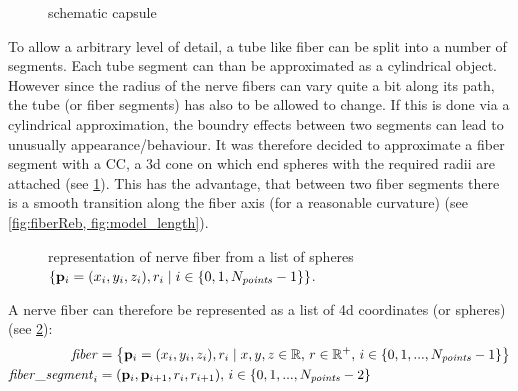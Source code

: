 % 
\begin{figure}[!t]
    \centering
    \setlength{\tikzwidth}{0.75\textwidth}
	\caption{schematic capsule}
	\label{fig:conical_capsule}
\end{figure}
% 
To allow a arbitrary level of detail, a tube like fiber can be split into a number of segments.
Each tube segment can than be approximated as a cylindrical object.
However since the radius of the nerve fibers can vary quite a bit along its path, the tube (or fiber segments) has also to be allowed to change.
If this is done via a cylindrical approximation, the boundry effects between two segments can lead to unusually appearance/behaviour.
It was therefore decided to approximate a fiber segment with a \ac{CC}, a 3d cone on which end spheres with the required radii are attached (see \cref{fig:conical_capsule}).
This has the advantage, that between two fiber segments there is a smooth transition along the fiber axis (for a reasonable curvature) (see \cref{fig:fiberReb, fig:model_length}).
% 
\begin{figure}[!t]
    \setlength{\tikzwidth}{0.85\textwidth}
    \centering
	\caption[]{representation of nerve fiber from a list of spheres $\left\{ \mathbf{p}_i=(x_i,y_i,z_i), r_i \mid i \in \{0,1,N_{\mathit{points}}-1\}\right\}$.}
	\label{fig:fiberReb}
\end{figure}
% 
A nerve fiber can therefore be represented as a list of 4d coordinates (or spheres) (see \cref{fig:fiberReb}):
% 
\begin{align}
\begin{split}
\mathit{fiber} &= \left\{ \mathbf{p}_i=(x_i,y_i,z_i), r_i \mid x,y,z \in \mathbb{R}, \, r \in \mathbb{R^+}, \, i \in \{0,1,...,N_{\mathit{points}}-1\}\right\} \\
\mathit{fiber\_segment}_i &= (\mathbf{p}_i, \mathbf{p}_{i+1}, r_i, r_{i+1}), \, i \in \{0,1,...,N_{\mathit{points}}-2\}
\end{split}
\end{align}
% 
